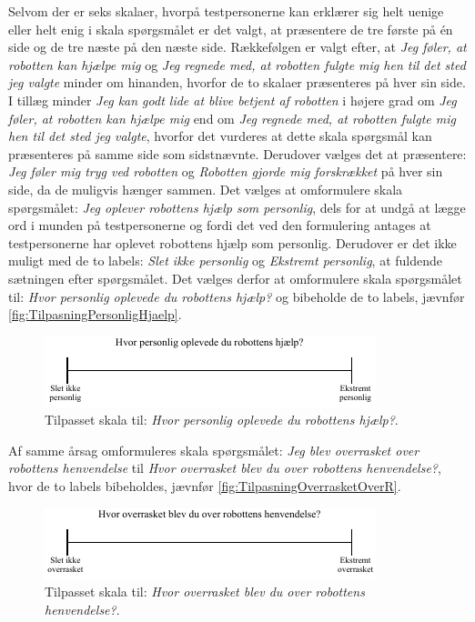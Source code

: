 \noindent
%
Selvom der er seks skalaer, hvorpå testpersonerne kan erklærer sig helt uenige eller helt enig i skala spørgsmålet er det valgt, at præsentere de tre første på én side og de tre næste på den næste side. Rækkefølgen er valgt efter, at \textit{Jeg føler, at robotten kan hjælpe mig} og \textit{Jeg regnede med, at robotten fulgte mig hen til det sted jeg valgte} minder om hinanden, hvorfor de to skalaer præsenteres på hver sin side. I tillæg minder \textit{Jeg kan godt lide at blive betjent af robotten} i højere grad om \textit{Jeg føler, at robotten kan hjælpe mig} end om \textit{Jeg regnede med, at robotten fulgte mig hen til det sted jeg valgte}, hvorfor det vurderes at dette skala spørgsmål kan præsenteres på samme side som sidstnævnte. Derudover vælges det at præsentere: \textit{Jeg føler mig tryg ved robotten} og \textit{Robotten gjorde mig forskrækket} på hver sin side, da de muligvis hænger sammen. \blankline
%
Det vælges at omformulere skala spørgsmålet: \textit{Jeg oplever robottens hjælp som personlig}, dels for at undgå at lægge ord i munden på testpersonerne og fordi det ved den formulering antages at testpersonerne har oplevet robottens hjælp som personlig. Derudover er det ikke muligt med de to labels: \textit{Slet ikke personlig} og \textit{Ekstremt personlig}, at fuldende sætningen efter spørgsmålet. Det vælges derfor at omformulere skala spørgsmålet til: \textit{Hvor personlig oplevede du robottens hjælp?} og bibeholde de to labels, jævnfør \autoref{fig:TilpasningPersonligHjaelp}. 
%
\begin{figure}[H]
\centering
\includegraphics[width =\textwidth]{Figure/TilpasningAfSkalaer/TilpassetPersonligHjaelp} 
\caption{Tilpasset skala til: \textit{Hvor personlig oplevede du robottens hjælp?}.}
\label{fig:TilpasningPersonligHjaelp}
\end{figure}
\noindent
%
Af samme årsag omformuleres skala spørgsmålet: \textit{Jeg blev overrasket over robottens henvendelse} til \textit{Hvor overrasket blev du over robottens henvendelse?}, hvor de to labels bibeholdes, jævnfør \autoref{fig:TilpasningOverrasketOverR}. 
%
\begin{figure}[H]
\centering
\includegraphics[width =\textwidth]{Figure/TilpasningAfSkalaer/TilpassetOverrasketOverR} 
\caption{Tilpasset skala til: \textit{Hvor overrasket blev du over robottens henvendelse?}.}
\label{fig:TilpasningOverrasketOverR}
\end{figure}
